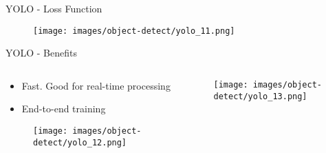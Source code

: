 \begin{frame}{YOLO - Loss Function}
    \begin{figure}
    \centering
    \texttt{[image: images/object-detect/yolo\_11.png]}
    \end{figure}
\end{frame}



\begin{frame}{YOLO - Benefits}
\begin{columns}
    \begin{column}{0.6\textwidth}
    \begin{itemize}
        \item Fast. Good for real-time processing
        \item End-to-end training
    \end{itemize}
    \begin{figure}
    \centering
    \texttt{[image: images/object-detect/yolo\_12.png]}
    \end{figure}
    
    \end{column}
    
    \begin{column}{0.4\textwidth}
    \begin{figure}
    \centering
    \texttt{[image: images/object-detect/yolo\_13.png]}
    \end{figure}
        
    \end{column}
\end{columns}
    
\end{frame}

